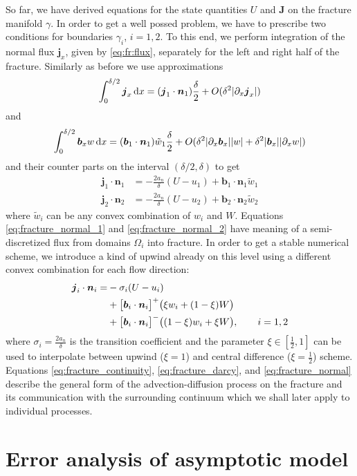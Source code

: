 \documentclass[a4paper]{article}
\def\prtl{\partial}
\def\vc#1{\mathbf{\boldsymbol{#1}}}     %
\def\abs#1{\lvert#1\rvert}
\def\d {\,{\rm d}}
\begin{document}
So far, we have derived equations for the state quantities $U$ and $\vc J$ on the fracture manifold $\gamma$. In order to
get a well possed problem, we have to prescribe two conditions for boundaries $\gamma_i$, $i=1,2$. To this end, we
perform integration of the normal flux $\vc j_x$, given by \eqref{eq:fr:flux}, separately for the left and right half of the fracture.
Similarly as before we use approximations
\[
 \int_0^{\delta/2} \vc j_x \d x = (\vc j_1 \cdot \vc n_1)\frac{\delta}{2} + O(\delta^2 \abs{\prtl_x \vc j_x})
\]
and 
\[
 \int_0^{\delta/2} \vc b_x w \d x = (\vc b_1 \cdot \vc n_1)\tilde{w}_1\frac{\delta}{2} + O(\delta^2 \abs{\prtl_x \vc b_x}\abs{w} + \delta^2\abs{\vc b_x}\abs{\prtl_x w})
\]
and their counter parts on the interval $(\delta/2, \delta)$ to get
\begin{align}
    \label{eq:fracture_normal_1}
     \vc j_1 \cdot \vc n_1 &= -\frac{2a_n}{\delta} (U - u_1) + \vc b_1\cdot \vc n_1 \tilde{w}_1\\
    \label{eq:fracture_normal_2}
    \vc j_2 \cdot \vc n_2 &= -\frac{2a_n}{\delta} (U - u_2) + \vc b_2\cdot \vc n_2 \tilde{w}_2
\end{align}
where $\tilde w_i$ can be any convex combination of $w_i$ and $W$. Equations \eqref{eq:fracture_normal_1}  
and \eqref{eq:fracture_normal_2} have meaning of a semi-discretized flux from domains $\Omega_i$ into fracture.
In order to get a stable numerical scheme, we introduce a kind of upwind already on this level using a different convex 
combination for each flow direction:
\begin{align}
   \notag 
   \vc j_i \cdot \vc n_i
       = &-\sigma_i (U - u_i)      \\ 
   \notag
      &+ \big[\vc b_i\cdot \vc n_i\big]^{+} \big(\xi w_i + (1-\xi) W\big)       \\
      \label{eq:fracture_normal}
      &+ \big[\vc b_i\cdot \vc n_i\big]^{-} \big((1-\xi) w_i + \xi W\big), \qquad i=1,2
\end{align}
where $\sigma_i = \frac{2a_n}{\delta}$ is the transition coefficient and the parameter $\xi\in [\frac12, 1]$ can be used to interpolate
between upwind ($\xi = 1$) and central difference ($\xi=\frac12$) scheme. Equations \eqref{eq:fracture_continuity}, \eqref{eq:fracture_darcy}, and
\eqref{eq:fracture_normal} describe the general form of the advection-diffusion process on the fracture and its communication with 
the surrounding continuum which we shall later apply to individual processes.

\section{Error analysis of asymptotic model}
\end{document}
